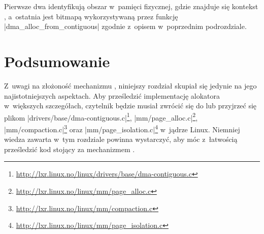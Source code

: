 Pierwsze dwa identyfikują obszar w~pamięci fizycznej, gdzie znajduje
się kontekst , a~ostatnia jest bitmapą wykorzystywaną przez funkcję
\code|dma_alloc_from_contiguous| zgodnie z~opisem w~poprzednim
podrozdziale.


\section{Podsumowanie}

Z~uwagi na złożoność mechanizmu , niniejszy rozdział skupiał
się jedynie na jego najistotniejszych aspektach.  Aby prześledzić
implementację alokatora  w~większych szczegółach, czytelnik
będzie musiał zwrócić się do \autocite{patch:cma-24} lub przyjrzeć się
plikom
\code|drivers/base/dma-contiguous.c|\footnote{\url{http://lxr.linux.no/linux/drivers/base/dma-contiguous.c}},
\code|mm/page_alloc.c|\footnote{\url{http://lxr.linux.no/linux/mm/page\_alloc.c}},
\code|mm/compaction.c|\footnote{\url{http://lxr.linux.no/linux/mm/compaction.c}}
oraz
\code|mm/page_isolation.c|\footnote{\url{http://lxr.linux.no/linux/mm/page\_isolation.c}}
w~jądrze Linux.  Niemniej wiedza zawarta w~tym rozdziale powinna
wystarczyć, aby móc z~łatwością prześledzić kod stojący za mechanizmem
.
